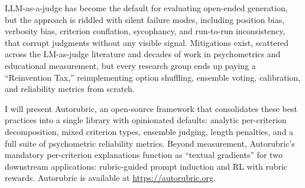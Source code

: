 LLM-as-a-judge has become the default for evaluating open-ended generation, but
the approach is riddled with silent failure modes, including position bias,
verbosity bias, criterion conflation, sycophancy, and run-to-run inconsistency,
that corrupt judgments without any visible signal. Mitigations exist, scattered
across the LM-as-judge literature and decades of work in psychometrics and
educational measurement, but every research group ends up paying a
``Reinvention Tax,'' reimplementing option shuffling, ensemble voting,
calibration, and reliability metrics from scratch.

I will present Autorubric, an open-source framework that consolidates these
best practices into a single library with opinionated defaults: analytic
per-criterion decomposition, mixed criterion types, ensemble judging, length
penalties, and a full suite of psychometric reliability metrics. Beyond
measurement, Autorubric's mandatory per-criterion explanations function as
``textual gradients'' for two downstream applications: rubric-guided prompt
induction and RL with rubric rewards. Autorubric is available at
\url{https://autorubric.org}.
